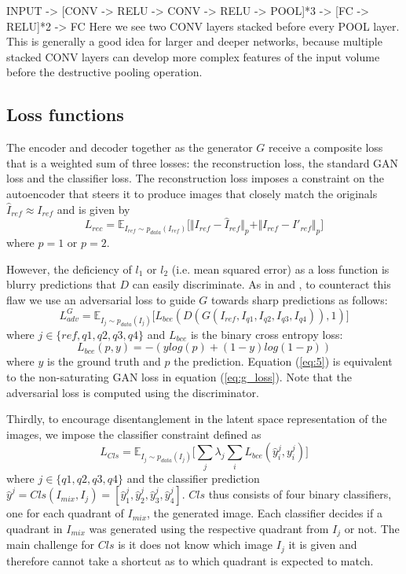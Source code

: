 \documentclass[11pt,a4paper]{article}
\begin{document}
\par INPUT -> [CONV -> RELU -> CONV -> RELU -> POOL]*3 -> [FC -> RELU]*2 -> FC
Here we see two CONV layers stacked before every POOL layer. This is generally a good
idea for larger and deeper networks, because multiple stacked CONV layers can develop
more complex features of the input volume before the destructive pooling operation.

\subsection{Loss functions}
The encoder and decoder together as the generator $G$ receive a composite loss that is a weighted sum of three losses: the reconstruction loss, the standard GAN loss and the classifier loss. The reconstruction loss imposes a constraint on the autoencoder that steers it to produce images that closely match the originals $\hat{I}_{ref} \approx I_{ref}$ and is given by
\begin{equation} \label{eq:4}
    L_{rec} = \mathbb{E}_{I_{ref}\sim p_{data} (I_{ref})}\big[ \Vert I_{ref} - \hat{I}_{ref} \Vert_p + \Vert I_{ref} - I'_{ref} \Vert_p \big]
\end{equation}
where $p = 1$ or $p = 2$.

However, the deficiency of $l_1$ or $l_2$ (i.e. mean squared error) as a loss function is blurry predictions that $D$ can easily discriminate. As in \cite{1711.07410} and \cite{1511.05440}, to counteract this flaw we use an adversarial loss to guide $G$ towards sharp predictions as follows:
\begin{equation} \label{eq:5}
    L^G_{adv} = \mathbb{E}_{I_{j}\sim p_{data} (I_{j})}\big[ L_{bce}(D(G(I_{ref},I_{q1},I_{q2},I_{q3},I_{q4})), 1)\big]
\end{equation}
where $j \in \{ref,q1,q2,q3,q4\}$ and $L_{bce}$ is the binary cross entropy loss:
\begin{equation} \label{eq:6}
    L_{bce}(p, y) = -(ylog(p) + (1 - y)log(1-p))
\end{equation}
where $y$ is the ground truth and $p$ the prediction. Equation (\ref{eq:5}) is equivalent to the non-saturating GAN loss in equation (\ref{eq:g_loss}). Note that the adversarial loss is computed using the discriminator.

Thirdly, to encourage disentanglement in the latent space representation of the images, we impose the classifier constraint defined as
\begin{equation} \label{eq:7}
    L_{Cls} = \mathbb{E}_{I_{j}\sim p_{data} (I_{j})}\big[\sum_{j} \lambda_j \sum_{i} L_{bce}(\hat{y}^j_i, y^j_i)\big]
\end{equation}
where $j \in \{q1,q2,q3,q4\}$ and the classifier prediction $\hat{y}^j = Cls(I_{mix}, I_j) = [\hat{y}^j_1, \hat{y}^j_2, \hat{y}^j_3, \hat{y}^j_4]$. $Cls$ thus consists of four binary classifiers, one for each quadrant of $I_{mix}$, the generated image. Each classifier decides if a quadrant in $I_{mix}$ was generated using the respective quadrant from $I_j$ or not. The main challenge for $Cls$ is it does not know which image $I_j$ it is given and therefore cannot take a shortcut as to which quadrant is expected to match.
\end{document}

